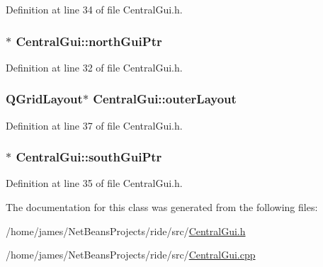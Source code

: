 Definition at line 34 of file Central\-Gui.\-h.

\hypertarget{class_central_gui_a9b03db6d32ac3138fde0213d41bea0af}{
\subsubsection[{north\-Gui\-Ptr}]{$\ast$ Central\-Gui\-::north\-Gui\-Ptr\hspace{0.3cm}{\ttfamily [private]}}}\label{class_central_gui_a9b03db6d32ac3138fde0213d41bea0af}


Definition at line 32 of file Central\-Gui.\-h.

\hypertarget{class_central_gui_ab10e8028968ca8d5bf7b2cfe4b257d52}{
\subsubsection[{outer\-Layout}]{\setlength{\rightskip}{0pt plus 5cm}Q\-Grid\-Layout$\ast$ Central\-Gui\-::outer\-Layout\hspace{0.3cm}{\ttfamily [private]}}}\label{class_central_gui_ab10e8028968ca8d5bf7b2cfe4b257d52}


Definition at line 37 of file Central\-Gui.\-h.

\hypertarget{class_central_gui_ae7012a7f0abe1fea596ce6af795c1741}{
\subsubsection[{south\-Gui\-Ptr}]{$\ast$ Central\-Gui\-::south\-Gui\-Ptr\hspace{0.3cm}{\ttfamily [private]}}}\label{class_central_gui_ae7012a7f0abe1fea596ce6af795c1741}


Definition at line 35 of file Central\-Gui.\-h.



The documentation for this class was generated from the following files\-:\begin{DoxyCompactItemize}
\item 
/home/james/\-Net\-Beans\-Projects/ride/src/\hyperlink{_central_gui_8h}{Central\-Gui.\-h}\item 
/home/james/\-Net\-Beans\-Projects/ride/src/\hyperlink{_central_gui_8cpp}{Central\-Gui.\-cpp}\end{DoxyCompactItemize}
